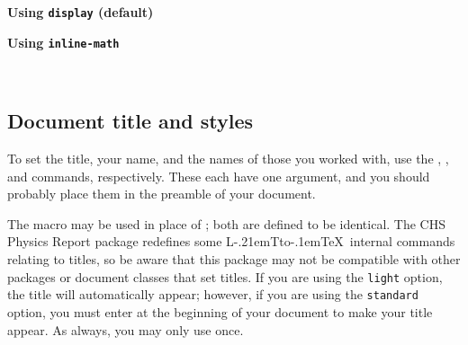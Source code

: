 \documentclass[12pt]{ltxdoc}
\makeatletter
\def\LaTeX{ L\kern -.21em{\sbox \z@ T\vbox to\ht \z@ {\hbox {\check@mathfonts \fontsize \sf@size \z@ \math@fontsfalse \selectfont A}\vss }}\kern -.1em\TeX}%
\makeatother
\begin{document}
\noindent\begin{minipage}{.5\textwidth}\centering
\bfseries Using \texttt{display} (default)
\end{minipage}
\begin{minipage}{.5\textwidth}\centering
\bfseries Using \texttt{inline-math}
\end{minipage}\\

\subsection{Document title and styles}

\DescribeMacro{\title}\DescribeMacro{\name}\DescribeMacro{\ww}
To set the title, your name, and the names of those you worked with, use the , , and  commands, respectively. These each have one argument, and you should probably place them in the preamble of your document. 

The  macro may be used in place of ; both are defined to be identical. The CHS Physics Report package redefines some \LaTeX\ internal commands relating to titles, so be aware that this package may not be compatible with other packages or document classes that set titles. If you are using the \verb|light| option, the title will automatically appear; however, if you are using the \texttt{standard} option, you must enter  at the beginning of your document to make your title appear. As always, you may only use  once. 
\end{document}
